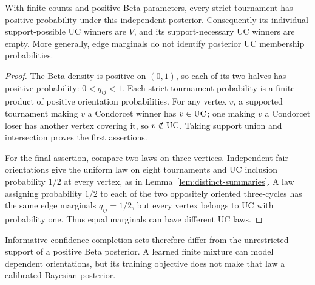 \begin{lemma}\label{lem:posterior-support-dependence}
With finite counts and positive Beta parameters, every strict tournament has positive probability under this independent posterior. Consequently its individual support-possible UC winners are $V$, and its support-necessary UC winners are empty. More generally, edge marginals do not identify posterior UC membership probabilities.
\end{lemma}
\begin{proof}
The Beta density is positive on $(0,1)$, so each of its two halves has positive probability: $0<q_{ij}<1$. Each strict tournament probability is a finite product of positive orientation probabilities. For any vertex $v$, a supported tournament making $v$ a Condorcet winner has $v\in\mathrm{UC}$; one making $v$ a Condorcet loser has another vertex covering it, so $v\notin\mathrm{UC}$. Taking support union and intersection proves the first assertions.

For the final assertion, compare two laws on three vertices. Independent fair orientations give the uniform law on eight tournaments and UC inclusion probability $1/2$ at every vertex, as in Lemma~\ref{lem:distinct-summaries}. A law assigning probability $1/2$ to each of the two oppositely oriented three-cycles has the same edge marginals $q_{ij}=1/2$, but every vertex belongs to UC with probability one. Thus equal marginals can have different UC laws.
\end{proof}
Informative confidence-completion sets therefore differ from the unrestricted support of a positive Beta posterior. A learned finite mixture can model dependent orientations, but its training objective does not make that law a calibrated Bayesian posterior.

